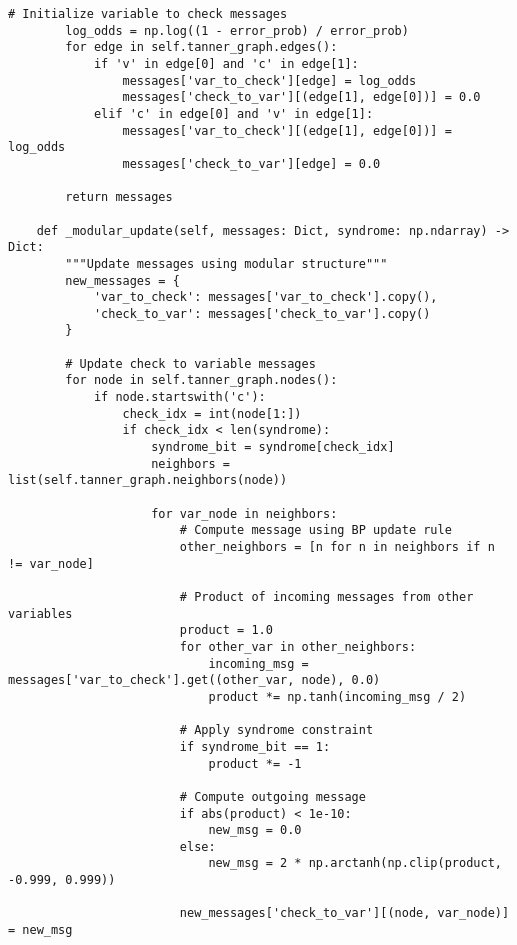 \documentclass[12pt,a4paper]{article}
\begin{document}
\begin{lstlisting}[style=python,caption=Belief propagation exploiting modular structure]
        # Initialize variable to check messages
        log_odds = np.log((1 - error_prob) / error_prob)
        for edge in self.tanner_graph.edges():
            if 'v' in edge[0] and 'c' in edge[1]:
                messages['var_to_check'][edge] = log_odds
                messages['check_to_var'][(edge[1], edge[0])] = 0.0
            elif 'c' in edge[0] and 'v' in edge[1]:
                messages['var_to_check'][(edge[1], edge[0])] = log_odds
                messages['check_to_var'][edge] = 0.0
        
        return messages
    
    def _modular_update(self, messages: Dict, syndrome: np.ndarray) -> Dict:
        """Update messages using modular structure"""
        new_messages = {
            'var_to_check': messages['var_to_check'].copy(),
            'check_to_var': messages['check_to_var'].copy()
        }
        
        # Update check to variable messages
        for node in self.tanner_graph.nodes():
            if node.startswith('c'):
                check_idx = int(node[1:])
                if check_idx < len(syndrome):
                    syndrome_bit = syndrome[check_idx]
                    neighbors = list(self.tanner_graph.neighbors(node))
                    
                    for var_node in neighbors:
                        # Compute message using BP update rule
                        other_neighbors = [n for n in neighbors if n != var_node]
                        
                        # Product of incoming messages from other variables
                        product = 1.0
                        for other_var in other_neighbors:
                            incoming_msg = messages['var_to_check'].get((other_var, node), 0.0)
                            product *= np.tanh(incoming_msg / 2)
                        
                        # Apply syndrome constraint
                        if syndrome_bit == 1:
                            product *= -1
                        
                        # Compute outgoing message
                        if abs(product) < 1e-10:
                            new_msg = 0.0
                        else:
                            new_msg = 2 * np.arctanh(np.clip(product, -0.999, 0.999))
                        
                        new_messages['check_to_var'][(node, var_node)] = new_msg
        

\end{lstlisting}
\end{document}

